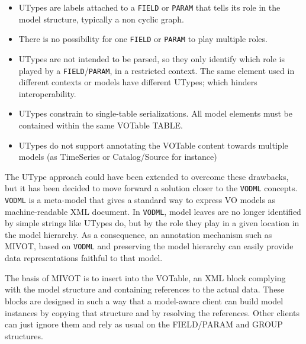 \begin{itemize}
  \item UTypes are labels attached to  a \texttt{FIELD} or \texttt{PARAM} that tells its role in the 
  model structure, typically a non cyclic graph. 
   \item There is no possibility for one  \texttt{FIELD} or \texttt{PARAM} to play multiple roles.
  \item UTypes are not intended to be parsed, so they only identify which role is played by a \texttt{FIELD}/\texttt{PARAM}, in a restricted context. The same element used in different contexts or models have different UTypes; which hinders interoperability.
  \item UTypes constrain to single-table serializations. All model elements must 
  be contained within the same VOTable TABLE. 
  \item UTypes do not support annotating the VOTable content towards multiple models 
  (as TimeSeries or Catalog/Source for instance)
\end{itemize}

The UType approach could have been extended to overcome these drawbacks, but it has been decided to move forward a solution closer to the \texttt{VODML} \citep{2018ivoa.spec.0910L} concepts. 
\texttt{VODML} is a meta-model that gives a standard way to express VO models as machine-readable XML document.
In \texttt{VODML},  model leaves are no longer identified by simple strings like UTypes do, but by the role they play in a given location in the model hierarchy.
As a consequence, an annotation mechanism such as MIVOT, based on \texttt{VODML} and preserving the model hierarchy can easily provide data representations faithful to that model.

The basis of MIVOT is to insert into the VOTable, an XML block complying with the 
model structure and containing references to the actual data.
These blocks are designed in such a way that a model-aware client can build  model instances by copying that structure and by resolving the references. 
Other clients can just ignore them and rely as usual on the FIELD/PARAM and GROUP structures.


